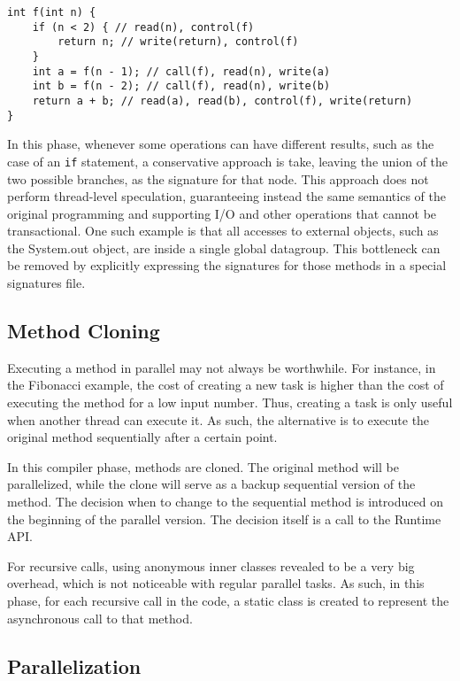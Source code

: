 \documentclass[smallextended]{svjour3}
\begin{document}
\begin{lstlisting}
int f(int n) {
    if (n < 2) { // read(n), control(f)
        return n; // write(return), control(f)
    }
    int a = f(n - 1); // call(f), read(n), write(a)
    int b = f(n - 2); // call(f), read(n), write(b)
    return a + b; // read(a), read(b), control(f), write(return)
}
\end{lstlisting}

In this phase, whenever some operations can have different results, such as the case of an \texttt{if} statement, a conservative approach is take, leaving the union of the two possible branches, as the signature for that node. This approach does not perform thread-level speculation, guaranteeing instead the same semantics of the original programming and supporting I/O and other operations that cannot be transactional. One such example is that all accesses to external objects, such as the System.out object, are inside a single global datagroup. This bottleneck can be removed by explicitly expressing the signatures for those methods in a special signatures file.

\subsection{Method Cloning}

Executing a method in parallel may not always be worthwhile. For instance, in the Fibonacci example, the cost of creating a new task is higher than the cost of executing the method for a low input number. Thus, creating a task is only useful when another thread can execute it. As such, the alternative is to execute the original method sequentially after a certain point. 

In this compiler phase, methods are cloned. The original method will be parallelized, while the clone will serve as a backup sequential version of the method. The decision when to change to the sequential method is introduced on the beginning of the parallel version. The decision itself is a call to the Runtime API.

For recursive calls, using anonymous inner classes revealed to be a very big overhead, which is not noticeable with regular parallel tasks. As such, in this phase, for each recursive call in the code, a static class is created to represent the asynchronous call to that method.

\subsection{Parallelization}
\end{document}
